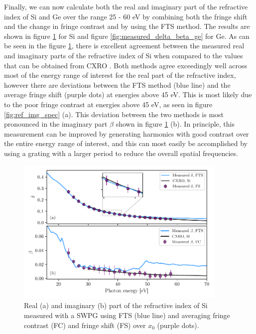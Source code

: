 Finally, we can now calculate both the real and imaginary part of the refractive index of Si and Ge over the range 25 - 60 eV by combining both the fringe shift and the change in fringe contrast and by using the FTS method.  The results are shown in figure \ref{fig:measured_delta_beta} for Si and figure \ref{fig:measured_delta_beta_ge} for Ge.  As can be seen in the figure \ref{fig:measured_delta_beta}, there is excellent agreement between the measured real and imaginary parts of the refractive index of Si when compared to the values that can be obtained from CXRO \cite{henkeXRayInteractionsPhotoabsorption1993}.  Both methods agree exceedingly well across most of the energy range of interest for the real part of the refractive index, however there are deviations between the FTS method (blue line) and the average fringe shift (purple dots) at energies above 45 eV.  This is most likely due to the poor fringe contrast at energies above 45 eV, as seen in figure \ref{fig:ref_img_spec} (a).  This deviation between the two methods is most pronounced in the imaginary part $\beta$ shown in figure \ref{fig:measured_delta_beta} (b).  In principle, this measurement can be improved by generating harmonics with good contrast over the entire energy range of interest, and this can most easily be accomplished by using a grating with a larger period to reduce the overall spatial frequencies.

\begin{figure}
	\centering
	\includegraphics[width=0.9\textwidth]{figures/refractive_index/db_cxro.pdf}
	\caption[Measured real and imaginary part of the refractive index of Si using a SWPG]{Real (a) and imaginary (b) part of the refractive index of Si measured with a SWPG using FTS (blue line) and averaging fringe contrast (FC) and fringe shift (FS) over $x_0$ (purple dots).}
	\label{fig:measured_delta_beta}
\end{figure}

